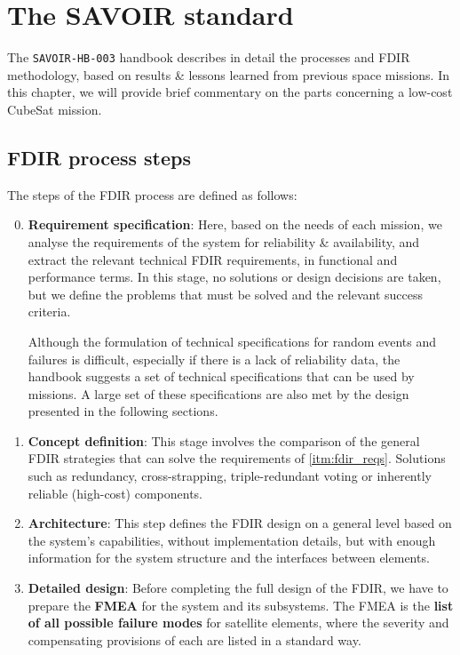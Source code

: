 \documentclass[a4paper,nobib]{tufte-book}
\begin{document}
\section{The SAVOIR standard}
The \texttt{SAVOIR-HB-003} handbook describes in detail the processes and \acs{FDIR} methodology, based on results \& lessons learned from previous space missions. In this chapter, we will provide brief commentary on the parts concerning a low-cost CubeSat mission.

\subsection{\acs{FDIR} process steps}

The steps of the \acs{FDIR} process are defined as follows:
\begin{enumerate}
	\setcounter{enumi}{-1}
	\item \textbf{Requirement specification}: Here, based on the needs of each mission, we analyse the requirements of the system for reliability \& availability, and extract the relevant technical \acs{FDIR} requirements, in functional and performance terms. In this stage, no solutions or design decisions are taken, but we define the problems that must be solved and the relevant success criteria.
	\label{itm:fdir_reqs}

	
	Although the formulation of technical specifications for random events and failures is difficult, especially if there is a lack of reliability data, the handbook suggests a set of technical specifications \autocite[42]{SAVOIR-HB-003} that can be used by missions. A large set of these specifications are also met by the design presented in the following sections.
	
	\item \textbf{Concept definition}: This stage involves the comparison of the general \acs{FDIR} strategies that can solve the requirements of \cref{itm:fdir_reqs}. Solutions such as redundancy, cross-strapping, triple-redundant voting or inherently reliable (high-cost) components.
	
	
	\label{itm:fdir_concept}

	\item \textbf{Architecture}: This step defines the \acs{FDIR} design on a general level based on the system's capabilities, without implementation details, but with enough information for the system structure and the interfaces between elements.
	
	\item \textbf{Detailed design}: Before completing the full design of the \acs{FDIR}, we have to prepare the \textbf{\acf{FMEA}} \autocite{carlson_effective_fmeas_2012} for the system and its subsystems. The \acs{FMEA} is the \textbf{list of all possible failure modes} for satellite elements, where the severity and compensating provisions of each are listed in a standard way.
	

\end{enumerate}
\end{document}
